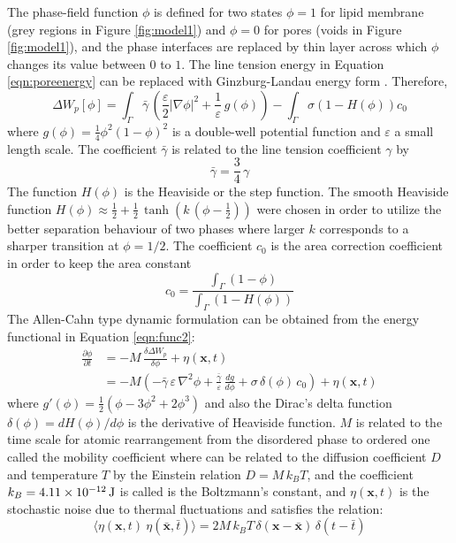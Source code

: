 \documentclass[english,12pt]{article}
\begin{document}
The phase-field function $\phi$ is defined for two states $\phi=1$ for lipid membrane (grey regions in Figure \ref{fig:model1}) and $\phi=0$ for pores (voids in Figure \ref{fig:model1}), and the phase interfaces are replaced by thin layer across which $\phi$ changes its value between $0$ to $1$. The line tension energy in Equation \ref{eqn:poreenergy} can be replaced with Ginzburg-Landau energy form \cite{elliott2010surface,du2011phase}. Therefore,
\begin{equation}
	\Delta W_p\left[\phi\right]=\int_{\Gamma}\bar{\gamma}\,\left(\frac{\varepsilon}{2}|\nabla\phi|^{2}+\frac{1}{\varepsilon}\,g\left(\phi\right) \right)-\int_{\Gamma}\sigma\left(1-H(\phi)\right)c_0
	\label{eqn:func2}
\end{equation}
where $g(\phi)=\frac{1}{4}\phi^2(1-\phi)^2$ is a double-well potential function and $\varepsilon$ a small length scale. The coefficient $\bar{\gamma}$ is related to the line tension coefficient $\gamma$ by
\begin{equation}
	\bar{\gamma}=\frac{3}{4}\,\gamma
	\label{eqn:tensioncoeff}
\end{equation}
The function $H(\phi)$ is the Heaviside or the step function. The smooth Heaviside function $H(\phi)\approx\frac{1}{2}+\frac{1}{2}\,\tanh\left(k\,(\phi-\frac{1}{2})\right)$ were chosen in order to utilize the better separation behaviour of two phases where larger $k$ corresponds to a sharper transition at $\phi=1/2$. The coefficient $c_0$ is the area correction coefficient in order to keep the area constant
\begin{equation}
	c_0=\frac{\int_\Gamma(1-\phi)}{\int_{\Gamma}\left(1-H(\phi)\right)}
\end{equation}
The Allen-Cahn type dynamic formulation can be obtained from the energy functional in Equation \ref{eqn:func2}:
\begin{align}
		\frac{\partial\phi}{\partial t}&=-M\,\frac{\delta\Delta W_p}{\delta\phi}+\eta(\mathbf{x},t) \nonumber \\
		&=-M\left(-\bar{\gamma}\,\varepsilon\,\nabla^2\phi+\frac{\bar{\gamma}}{\varepsilon}\,\frac{dg}{d\phi}  + \sigma\,\delta(\phi)\,c_0\right)+\eta(\mathbf{x},t)
		\label{pf}
\end{align}
where $g'(\phi)=\frac{1}{2}\left(\phi-3\phi^2+2\phi^3\right)$ and also the Dirac's delta function $\delta(\phi)=dH(\phi)/d\phi$ is the derivative of Heaviside function. $M$ is related to the time scale for atomic rearrangement from the disordered phase to ordered one called the mobility coefficient where can be related to the diffusion coefficient $D$ and temperature $T$ by the Einstein relation $D=M\,k_B T$, and the coefficient $k_B=\unit[4.11\times10^{-12}]{J}$ is called is the Boltzmann's constant, and $\eta(\mathbf{x},t)$ is the stochastic noise due to thermal fluctuations and satisfies the relation:
\begin{equation}
\langle\eta(\mathbf{x},t)\ \eta(\mathbf{\bar{x}},\bar{t})\rangle=2M\,k_B T\,\delta(\mathbf{x}-\mathbf{\bar{x}})\,\delta(t-\bar{t})
\end{equation}
\end{document}
